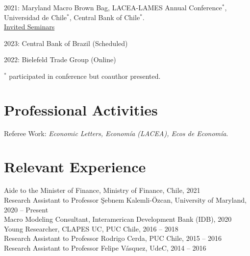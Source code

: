 \documentclass[11pt]{article}
\begin{document}
2021: Maryland Macro Brown Bag, LACEA-LAMES Annual Conference$^\ast$, Universidad de Chile$^\ast$, Central Bank of Chile$^\ast$.\\



\underline{Invited Seminars}

2023: Central Bank of Brazil (Scheduled)

2022:  Bielefeld Trade Group (Online)


{\footnotesize $^\ast$ participated in conference but coauthor presented.}

\section*{Professional Activities}
Referee Work:  \emph{Economic Letters, Econom\'ia (LACEA), Ecos de Econom\'ia}.

%
%
%





\section*{Relevant Experience}


Aide to the Minister of Finance, Ministry of Finance, Chile, 2021 \\
Research Assistant to Professor \c{S}ebnem Kalemli-\"{O}zcan, University of Maryland, 2020 -- Present\\
Macro Modeling Consultant,  Interamerican Development Bank (IDB), 2020\\
Young Researcher, CLAPES UC, PUC Chile, 2016 -- 2018\\
Research Assistant to Professor Rodrigo Cerda, PUC Chile, 2015 -- 2016\\
Research Assistant to Professor Felipe V\'asquez, UdeC, 2014 -- 2016
\end{document}
